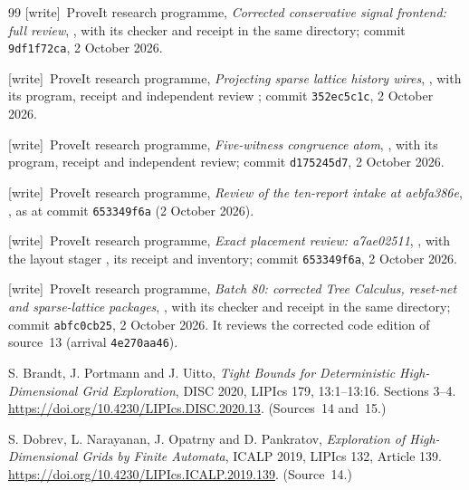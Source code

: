 \documentclass[11pt,letterpaper]{article}
\numberwithin{equation}{section}
\theoremstyle{definition}
\theoremstyle{remark}
\newcommand{\wtag}{\textup{[write]}}
\begin{document}
\begin{thebibliography}{99}
\wtag\ ProveIt research programme, \emph{Corrected conservative signal frontend: full review}, , with its checker and receipt in the same directory; commit \texttt{9df1f72ca}, 2 October 2026.

\wtag\ ProveIt research programme, \emph{Projecting sparse lattice history wires}, , with its program, receipt and independent review ; commit \texttt{352ec5c1c}, 2 October 2026.

\wtag\ ProveIt research programme, \emph{Five-witness congruence atom}, , with its program, receipt and independent review; commit \texttt{d175245d7}, 2 October 2026.

\wtag\ ProveIt research programme, \emph{Review of the ten-report intake at aebfa386e}, , as at commit \texttt{653349f6a} (2 October 2026).

\wtag\ ProveIt research programme, \emph{Exact placement review: a7ae02511}, , with the layout stager , its receipt and inventory; commit \texttt{653349f6a}, 2 October 2026.

\wtag\ ProveIt research programme, \emph{Batch 80: corrected Tree Calculus, reset-net and sparse-lattice packages}, , with its checker and receipt in the same directory; commit \texttt{abfc0cb25}, 2 October 2026. It reviews the corrected code edition of source~13 (arrival \texttt{4e270aa46}).


S. Brandt, J. Portmann and J. Uitto, \emph{Tight Bounds for Deterministic High-Dimensional Grid Exploration}, DISC 2020, LIPIcs 179, 13:1--13:16. Sections 3--4. \url{https://doi.org/10.4230/LIPIcs.DISC.2020.13}.
(Sources~14 and~15.)

S. Dobrev, L. Narayanan, J. Opatrny and D. Pankratov, \emph{Exploration of High-Dimensional Grids by Finite Automata}, ICALP 2019, LIPIcs 132, Article 139. \url{https://doi.org/10.4230/LIPIcs.ICALP.2019.139}.
(Source~14.)


\end{thebibliography}
\end{document}
